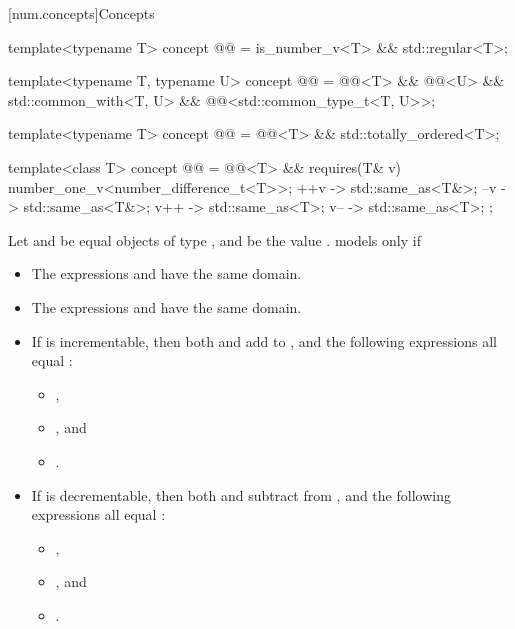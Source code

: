 [num.concepts]{Concepts}

\begin{itemdecl}
template<typename T>
concept @@ = is_number_v<T> && std::regular<T>;

template<typename T, typename U>
concept @@ =
  @@<T> && @@<U> && std::common_with<T, U> && @@<std::common_type_t<T, U>>;

template<typename T>
concept @@ = @@<T> && std::totally_ordered<T>;
\end{itemdecl}

\begin{itemdecl}
template<class T>
concept @@ =
  @@<T> &&
  requires(T& v) {
    number_one_v<number_difference_t<T>>;
    { ++v } -> std::same_as<T&>;
    { --v } -> std::same_as<T&>;
    { v++ } -> std::same_as<T>;
    { v-- } -> std::same_as<T>;
  };
\end{itemdecl}

\begin{itemdescr}
\pnum
Let  and  be equal objects of type ,
and  be the value .
 models  only if
\begin{itemize}
\item
The expressions  and  have the same domain.
\item
The expressions  and  have the same domain.
\item
If  is incrementable,
then both  and  add  to ,
and the following expressions all equal :
\begin{itemize}
\item {},
\item {}, and
\item {}.
\end{itemize}
\item
If  is decrementable,
then both  and  subtract  from ,
and the following expressions all equal :
\begin{itemize}
\item {},
\item {}, and
\item {}.
\end{itemize}
\end{itemize}
\end{itemdescr}

